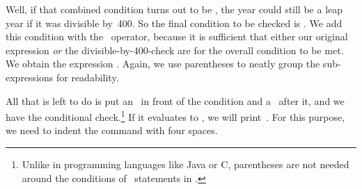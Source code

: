 \begin{sloppypar}%
Well, if that combined condition turns out to be , the year could still be a leap year if it was divisible by~400.
So the final condition to be checked is .
We add this condition with the ~operator, because it is sufficient that either our original expression \emph{or} the divisible-by-400-check are  for the overall condition to be met.
We obtain the expression .
Again, we use parentheses to neatly group the sub-expressions for readability.%
\end{sloppypar}%
%
All that is left to do is put an~ in front of the condition and a~\pythonilIdx{:} after it, and we have the conditional check.\footnote{%
Unlike in programming languages like \gls{Java} or \gls{C}, parentheses are not needed around the conditions of ~statements in \python.%
}
If it evaluates to , we will print~.
For this purpose, we need to indent the  command with four spaces.


